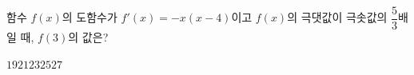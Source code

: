 함수 $f(x)$의 도함수가 $f'(x)=-x(x-4)$이고 $f(x)$의 극댓값이 극솟값의 $\dfrac{5}{3}$배일 때, $f(3)$의 값은?
\begin{choices32}{$19$}{$21$}{$23$}{$25$}{$27$}\end{choices32}

